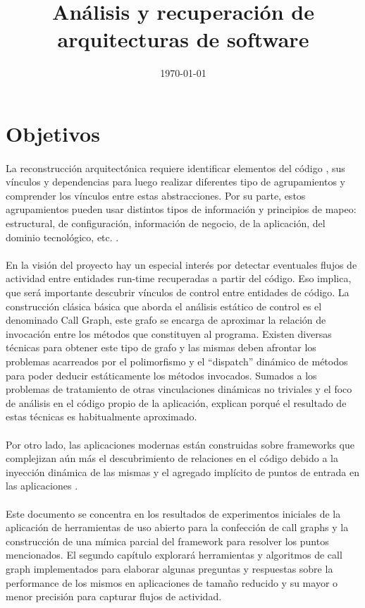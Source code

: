 \documentclass[a4paper,10pt]{article}
\title{An\'alisis y recuperaci\'on de arquitecturas de software}
\date{\today}
\author{}
\begin{document}
\maketitle
\section*{Objetivos}
\paragraph{}
La reconstrucción arquitectónica requiere identificar elementos del código , sus vínculos y dependencias para luego realizar diferentes tipo de agrupamientos y comprender los vínculos entre estas abstracciones. Por su parte, estos agrupamientos pueden usar distintos tipos de información y principios de mapeo: estructural, de configuración, información de negocio, de la aplicación, del dominio tecnológico, etc. \cite{neno}. 
\paragraph{}
En la visión del proyecto hay un especial interés por detectar eventuales flujos de actividad entre entidades run-time recuperadas a partir del código. Eso implica, que será importante descubrir vínculos de control entre entidades de código. La construcción clásica b\'asica que aborda el análisis estático de control es el denominado Call Graph, este grafo se encarga de aproximar la relación de invocación entre los métodos que constituyen al programa. Existen diversas técnicas para obtener este tipo de grafo y las mismas deben afrontar los problemas acarreados por el polimorfismo y el “dispatch” dinámico de métodos para poder deducir estáticamente los métodos invocados. Sumados a los problemas de tratamiento de otras vinculaciones dinámicas no triviales y el foco de análisis en el código propio de la aplicación, explican porqué el resultado de estas técnicas es habitualmente aproximado. 
\paragraph{}
Por otro lado, las aplicaciones modernas están construidas sobre frameworks que complejizan aún más el descubrimiento de relaciones en el c\'odigo debido a la inyección dinámica de las mismas y el agregado impl\'icito de puntos de entrada en las aplicaciones \cite{ff}.
\paragraph{}
Este documento se concentra en los resultados de experimentos iniciales de la aplicación de herramientas de uso abierto para la confecci\'on de call graphs y la construcción de una mímica parcial del framework para resolver los puntos mencionados. El segundo cap\'itulo explorar\'a herramientas y algoritmos de call graph implementados para elaborar algunas preguntas y respuestas sobre la performance de los mismos en aplicaciones de tamaño reducido y su mayor o menor precisión para capturar flujos de actividad.
\end{document}
